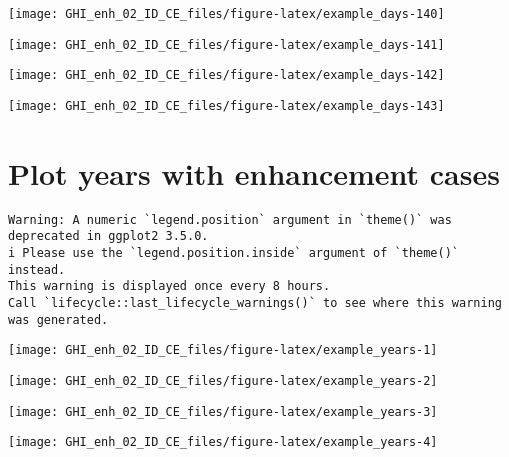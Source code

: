 \documentclass[
  10pt,
  a4paper,oneside]{article}
\begin{document}
\begin{center}\texttt{[image: GHI\_enh\_02\_ID\_CE\_files/figure-latex/example\_days-140]} \end{center}

\begin{center}\texttt{[image: GHI\_enh\_02\_ID\_CE\_files/figure-latex/example\_days-141]} \end{center}

\begin{center}\texttt{[image: GHI\_enh\_02\_ID\_CE\_files/figure-latex/example\_days-142]} \end{center}

\begin{center}\texttt{[image: GHI\_enh\_02\_ID\_CE\_files/figure-latex/example\_days-143]} \end{center}

\newpage
\FloatBarrier

\hypertarget{plot-years-with-enhancement-cases}{%
\section{Plot years with enhancement cases}\label{plot-years-with-enhancement-cases}}

\begin{verbatim}
Warning: A numeric `legend.position` argument in `theme()` was deprecated in ggplot2 3.5.0.
i Please use the `legend.position.inside` argument of `theme()` instead.
This warning is displayed once every 8 hours.
Call `lifecycle::last_lifecycle_warnings()` to see where this warning was generated.
\end{verbatim}

\begin{center}\texttt{[image: GHI\_enh\_02\_ID\_CE\_files/figure-latex/example\_years-1]} \end{center}

\begin{center}\texttt{[image: GHI\_enh\_02\_ID\_CE\_files/figure-latex/example\_years-2]} \end{center}

\begin{center}\texttt{[image: GHI\_enh\_02\_ID\_CE\_files/figure-latex/example\_years-3]} \end{center}

\begin{center}\texttt{[image: GHI\_enh\_02\_ID\_CE\_files/figure-latex/example\_years-4]} \end{center}
\end{document}
